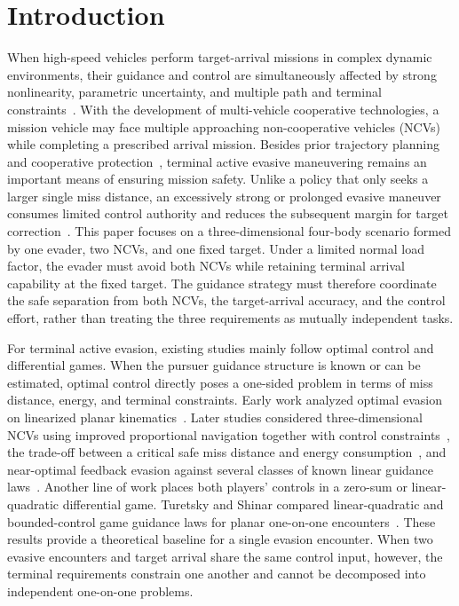 \section{Introduction}
When high-speed vehicles perform target-arrival missions in complex dynamic environments, their guidance and control are simultaneously affected by strong nonlinearity, parametric uncertainty, and multiple path and terminal constraints~\cite{ding2022review}. With the development of multi-vehicle cooperative technologies, a mission vehicle may face multiple approaching non-cooperative vehicles (NCVs) while completing a prescribed arrival mission. Besides prior trajectory planning and cooperative protection~\cite{prokopov2013}, terminal active evasive maneuvering remains an important means of ensuring mission safety. Unlike a policy that only seeks a larger single miss distance, an excessively strong or prolonged evasive maneuver consumes limited control authority and reduces the subsequent margin for target correction~\cite{li2024cja,wang2024}. This paper focuses on a three-dimensional four-body scenario formed by one evader, two NCVs, and one fixed target. Under a limited normal load factor, the evader must avoid both NCVs while retaining terminal arrival capability at the fixed target. The guidance strategy must therefore coordinate the safe separation from both NCVs, the target-arrival accuracy, and the control effort, rather than treating the three requirements as mutually independent tasks.

For terminal active evasion, existing studies mainly follow optimal control and differential games. When the pursuer guidance structure is known or can be estimated, optimal control directly poses a one-sided problem in terms of miss distance, energy, and terminal constraints. Early work analyzed optimal evasion on linearized planar kinematics~\cite{shinar1977}. Later studies considered three-dimensional NCVs using improved proportional navigation together with control constraints~\cite{feng2023}, the trade-off between a critical safe miss distance and energy consumption~\cite{wang2024}, and near-optimal feedback evasion against several classes of known linear guidance laws~\cite{shaferman2021}. Another line of work places both players' controls in a zero-sum or linear-quadratic differential game. Turetsky and Shinar compared linear-quadratic and bounded-control game guidance laws for planar one-on-one encounters~\cite{turetsky2003}. These results provide a theoretical baseline for a single evasion encounter. When two evasive encounters and target arrival share the same control input, however, the terminal requirements constrain one another and cannot be decomposed into independent one-on-one problems.

